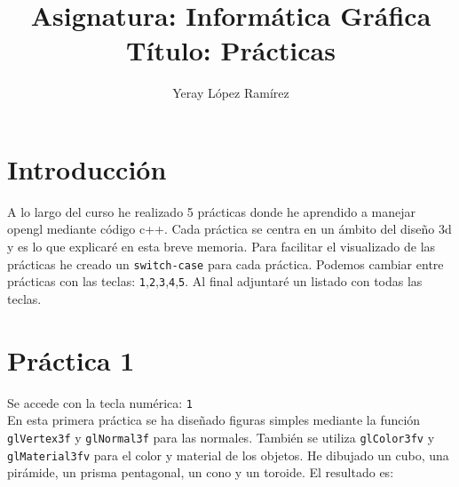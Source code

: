

\title{Asignatura: Informática Gráfica\\
	Título: Prácticas  \hspace{0.05cm} }   

\author{Yeray López Ramírez	}                             

\renewcommand*\contentsname{hola}

\makeatletter
\let\thetitle\@title
\let\theauthor\@author
\let\thedate\@date
\makeatother





\newpage %
\newcommand{\code}[1]{\colorbox{light-gray}{\textcolor{alizarin}{\texttt{#1}}}}
\newcommand{\high}[1]{\colorbox{light-gray}{\textcolor{nyellow}{\texttt{#1}}}}

\tableofcontents %

\newpage


\section{Introducción}
A lo largo del curso he realizado 5 prácticas donde he aprendido a manejar opengl mediante código c++. Cada práctica se centra en un ámbito del diseño 3d y es lo que explicaré en esta breve memoria. Para facilitar el visualizado de las prácticas he creado un \code{switch-case} para cada práctica. Podemos cambiar entre prácticas con las teclas: \high{1},\high{2},\high{3},\high{4},\high{5}. Al final adjuntaré un listado con todas las teclas.
\section{Práctica 1}
Se accede con la tecla numérica: \code{1}\\
En esta primera práctica se ha diseñado figuras simples mediante la función \code{glVertex3f} y \code{glNormal3f} para las normales. También se utiliza \code{glColor3fv} y \code{glMaterial3fv} para el color y material de los objetos. He dibujado un cubo, una pirámide, un prisma pentagonal, un cono y un toroide. El resultado es:

